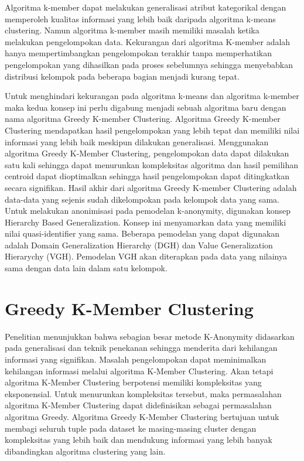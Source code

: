 \par Algoritma k-member dapat melakukan generalisasi atribut kategorikal dengan memperoleh kualitas informasi yang lebih baik daripada algoritma k-means clustering. Namun algoritma k-member masih memiliki masalah ketika melakukan pengelompokan data. Kekurangan dari algoritma K-member adalah hanya mempertimbangkan pengelompokan terakhir tanpa memperhatikan pengelompokan yang dihasilkan pada proses sebelumnya sehingga menyebabkan distribusi kelompok pada beberapa bagian menjadi kurang tepat. 

\par Untuk menghindari kekurangan pada algoritma k-means dan algoritma k-member maka kedua konsep ini perlu digabung menjadi sebuah algoritma baru dengan nama algoritma Greedy K-member Clustering. Algoritma Greedy K-member Clustering mendapatkan hasil pengelompokan yang lebih tepat dan memiliki nilai informasi yang lebih baik meskipun dilakukan generalisasi. Menggunakan algoritma Greedy K-Member Clustering, pengelompokan data dapat dilakukan satu kali sehingga dapat menurunkan kompleksitas algoritma dan hasil  pemilihan centroid dapat dioptimalkan sehingga hasil pengelompokan dapat ditingkatkan secara signifikan. Hasil akhir dari algoritma Greedy K-member Clustering adalah data-data yang sejenis sudah dikelompokan pada kelompok data yang sama. Untuk melakukan anonimisasi pada pemodelan k-anonymity, digunakan konsep Hierarchy Based Generalization. Konsep ini menyamarkan data yang  memiliki nilai quasi-identifier yang sama. Beberapa pemodelan yang dapat digunakan adalah Domain Generalization Hierarchy (DGH) dan Value Generalization Hierarychy (VGH). Pemodelan VGH akan diterapkan pada data yang nilainya sama dengan data lain dalam satu kelompok. 


\section{Greedy K-Member Clustering}
\label{sec:greedyclustering}
Penelitian menunjukkan bahwa sebagian besar metode K-Anonymity didasarkan pada generalisasi dan teknik penekanan sehingga menderita dari kehilangan informasi yang signifikan. Masalah pengelompokan dapat meminimalkan kehilangan informasi melalui algoritma K-Member Clustering. Akan tetapi algoritma K-Member Clustering berpotensi memiliki kompleksitas yang eksponensial. Untuk menurunkan kompleksitas tersebut, maka permasalahan algoritma K-Member Clustering dapat didefinisikan sebagai permasalahan algoritma Greedy. Algoritma Greedy K-Member Clustering bertujuan untuk membagi seluruh tuple pada dataset ke masing-masing cluster dengan kompleksitas yang lebih baik dan mendukung informasi yang lebih banyak dibandingkan algoritma clustering yang lain.

